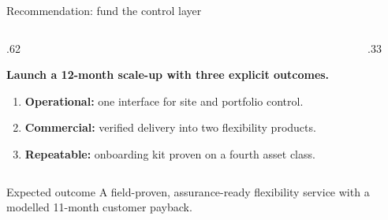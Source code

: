 \documentclass[10pt,aspectratio=169]{beamer}
\begin{document}
\begin{frame}{Recommendation: fund the control layer}
  \begin{columns}[T,onlytextwidth]
    \begin{column}{.62\textwidth}
      {\fontsize{19}{23}\selectfont\bfseries\color{SintefDeep}
       Launch a 12-month scale-up with three explicit outcomes.\par}
      \vspace{2mm}
      \begin{enumerate}
        \item \textbf{Operational:} one interface for site and portfolio control.
        \item \textbf{Commercial:} verified delivery into two flexibility products.
        \item \textbf{Repeatable:} onboarding kit proven on a fourth asset class.
      \end{enumerate}
    \end{column}
    \begin{column}{.33\textwidth}
    \end{column}
  \end{columns}
  \vfill
  \begin{exampleblock}{Expected outcome}
    A field-proven, assurance-ready flexibility service with a modelled 11-month customer payback.
  \end{exampleblock}
\end{frame}
\end{document}
